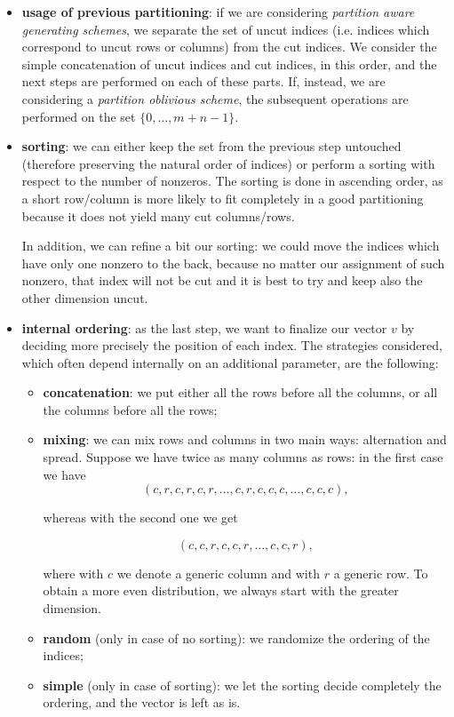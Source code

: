 \begin{itemize}
	\item \textbf{usage of previous partitioning}: if we are considering \emph{partition aware generating schemes}, we separate the set of uncut indices (i.e. indices which correspond to uncut rows or columns) from the  cut indices. We consider the simple concatenation of uncut indices and cut indices, in this order, and the next steps are performed on each of these parts. If, instead, we are considering a \emph{partition oblivious scheme}, the subsequent operations are performed on the set $\{0,\dots,m+n-1\}$.

	\item \textbf{sorting}: we can either keep the set from the previous step untouched (therefore preserving the natural order of indices) or perform a sorting with respect to the number of nonzeros. The sorting is done in ascending order, as a short row/column is more likely to fit completely in a good partitioning because it does not yield many cut columns/rows.

		In addition, we can refine a bit our sorting: we could move the indices which have only one nonzero to the back, because no matter our assignment of such nonzero, that index will not be cut and it is best to try and keep also the other dimension uncut. 

	\item \textbf{internal ordering}: as the last step, we want to finalize our vector $v$ by deciding more precisely the position of each index. The strategies considered, which often depend internally on an additional parameter, are the following:

		\begin{itemize}
			\item \textbf{concatenation}: we put either all the rows before all the columns, or all the columns before all the rows;
			\item \textbf{mixing}: we can mix rows and columns in two main ways: alternation and spread. Suppose we have twice as many columns as rows: in the first case we have 
				$$(c,r,c,r,c,r,\dots,c,r,c,c,c,\dots,c,c,c),$$

				whereas with the second one we get 

				$$(c,c,r,c,c,r,\dots,c,c,r),$$

				where with $c$ we denote a generic column and with $r$ a generic row. To obtain a more even distribution, we always start with the greater dimension.
			\item \textbf{random} (only in case of no sorting): we randomize the ordering of the indices;
			\item \textbf{simple} (only in case of sorting): we let the sorting decide completely the ordering, and the vector is left as is.
		\end{itemize}
\end{itemize}

